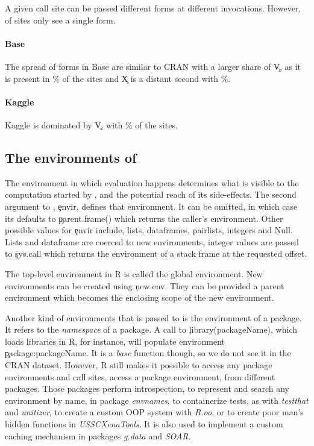 \documentclass[screen,acmsmall]{acmart}
\begin{document}
A given \eval call site can be passed different forms at different invocations.
However, \packageNbOneMinimizedPercent of sites only see a single form.

\paragraph{Base}
The spread of forms in Base are similar to CRAN with a larger share of \c{V}, as
it is present in \baseMinimizedpropsitesa\% of the sites and \c{X} is a distant
second with \baseMinimizedpropsitesb\%.

\paragraph{Kaggle}
Kaggle is dominated by \c{V}, with \kaggleMinimizedpropsitesa\% of the
\kaggleNbCallSites sites.

\subsection{The environments of \eval}

The environment in which evaluation happens determines what is visible to the
computation started by \eval, and the potential reach of its side-effects. The
second argument to \eval, \c{envir}, defines that environment. It can be
omitted, in which case its defaults to \c{parent.frame()} which returns the
caller's environment. Other possible values for \c{envir} include, lists,
dataframes, pairlists, integers and \c{Null}. Lists and dataframe are coerced to
new environments, integer values are passed to \c{sys.call} which returns the
environment of a stack frame at the requested offset.



The top-level environment in R is called the global environment. New
environments can be created using \c{new.env}. They can be provided a parent
environment which becomes the enclosing scope of the new environment.

Another kind of environments that is passed to \eval is the environment of a
package. It refers to the \emph{namespace} of a package. A call to
\c{library(packageName)}, which loads libraries in R, for instance, will
populate environment \c{package:packageName}. It is a \emph{base} function
though, so we do not see it in the CRAN dataset. However, R still makes it
possible to access any package environments and \packageNbPackageEnvSites call
sites, \ie \packagePackageEnvSitePercent access a package environment, from
\packageNbPackageEnvPackages different packages. Those packages perform
introspection, to represent and search any environment by name, in package
\emph{envnames}, to containerize tests, as with \emph{testthat} and
\emph{unitizer}, to create a custom OOP system with \emph{R.oo}, or to create
poor man's hidden functions in \emph{USSCXenaTools}. It is also used to
implement a custom caching mechanism in packages \emph{g.data} and \emph{SOAR}.
\end{document}
